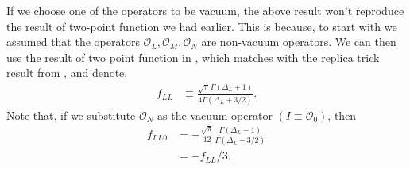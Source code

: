 \documentclass[11pt]{article}
\newcommand{\mO}{\mathcal{O}}
\begin{document}
If we choose one of the operators to be vacuum, the above result won't reproduce the result of two-point function we had earlier. This is because, to start with we assumed that the operators $\mO_L, \mO_M,\mO_N$ are non-vacuum operators. We can then use the result of two point function in \cite{S_rosi_2018}, which matches with the replica trick result from \cite{calabrese2011entanglement}, and denote, 
\begin{align}
    f_{LL} &\equiv \frac{\sqrt{\pi }\Gamma(\Delta_L+1)}{4 \Gamma(\Delta_L + 3/2)}.
\end{align}
Note that, if we substitute $\mO_N$ as the vacuum operator $(I \equiv \mO_0)$, then
\begin{align}
    f_{LL0} &=-\frac{\sqrt \pi}{12}\frac{\Gamma(\Delta_L+1)}{\Gamma(\Delta_L+3/2)} \\
    &=-f_{LL}/3.
\end{align}
\end{document}
